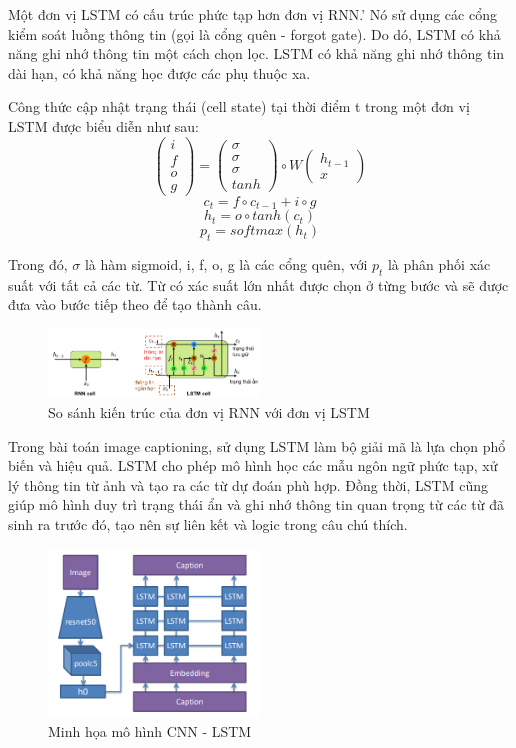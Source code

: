 \documentclass[conference]{IEEEtran}
\begin{document}
Một đơn vị LSTM có cấu trúc phức tạp hơn đơn vị RNN.'
Nó sử dụng các cổng kiểm soát luồng thông tin (gọi là cổng quên - forgot gate).
Do dó, LSTM có khả năng ghi nhớ thông tin một cách chọn lọc.
LSTM có khả năng ghi nhớ thông tin dài hạn, có khả năng học được các phụ thuộc xa.

Công thức cập nhật trạng thái (cell state) tại thời điểm t trong một đơn vị LSTM được biểu diễn như sau:
$$
\begin{pmatrix}
i \\
f \\
o \\
g
\end{pmatrix}
= 
\begin{pmatrix}
\sigma \\
\sigma \\
\sigma \\
tanh
\end{pmatrix}
\circ
W
\begin{pmatrix}
h_{t-1} \\
x
\end{pmatrix}
$$
$$
c_t = f\circ c_{t-1} + i\circ g
$$
$$
h_t = o \circ tanh(c_t)
$$
$$
p_t = softmax(h_t)
$$

Trong đó, $\sigma$ là hàm sigmoid, i, f, o, g là các cổng quên, với $p_t$ là phân phối xác suất với tất cả các từ. Từ có xác suất lớn nhất được chọn ở từng bước và sẽ được đưa vào bước tiếp theo để tạo thành câu. 

\begin{figure}[h]
\includegraphics[width=0.5\textwidth]{assets/RNN_LSTM_compare.png}
  \caption{So sánh kiến trúc của đơn vị RNN với đơn vị LSTM}
  \label{fig:RNN_LSTM_compare}
\end{figure}

Trong bài toán image captioning, sử dụng LSTM làm bộ giải mã là lựa chọn phổ biến và hiệu quả.
LSTM cho phép mô hình học các mẫu ngôn ngữ phức tạp, xử lý thông tin từ ảnh và tạo ra các từ dự đoán phù hợp.
Đồng thời, LSTM cũng giúp mô hình duy trì trạng thái ẩn và ghi nhớ thông tin quan trọng từ các từ đã sinh ra trước đó, tạo nên sự liên kết và logic trong câu chú thích.

\begin{figure}[h]
\includegraphics[width=0.5\textwidth]{assets/architecture_CNN_LSTM.png}
  \caption{Minh họa mô hình CNN - LSTM}
  \label{fig:CNN_LSTM}
\end{figure}
\end{document}
